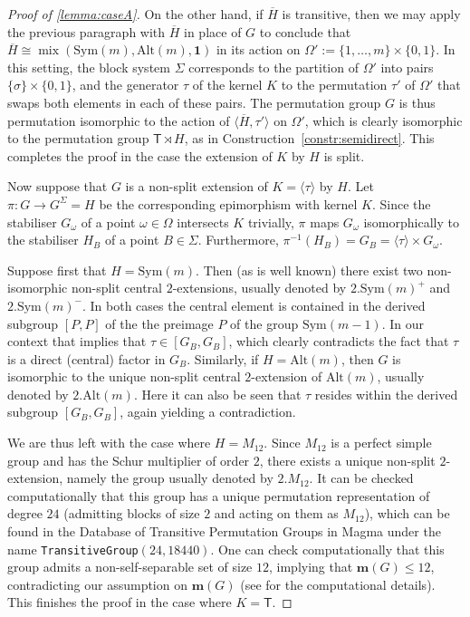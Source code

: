 \documentclass[a4paper]{amsart}
\newcommand{\primozcomment}[1]{\textcolor{magenta}{{\textbf{Primoz:} #1}}}
\newcommand{\Sym}{\mathrm{Sym}}
\newcommand{\Alt}{\mathrm{Alt}}
\newcommand{\m}{\mathbf{m}}
\newcommand{\mix}{\mathop{\mathrm{mix}}}
\newcommand{\one}{\mathbf{1}}
\theoremstyle{definition}
\begin{document}
\begin{proof}[Proof of \cref{lemma:caseA}]
On the other hand, if $\overline{H}$ is transitive, then we may apply the previous paragraph with 
$\overline{H}$ in place of
$G$ to conclude that $\overline{H} \cong \mix(\Sym(m),\Alt(m),\one)$ in its action on $\Omega':=\{1,\ldots,m\} \times \{0,1\}$. In this setting, the block system $\Sigma$ corresponds to the partition of $\Omega'$ into pairs $\{\sigma\} \times \{0,1\}$, and the generator $\tau$ of the kernel $K$ to the permutation
$\tau'$ of $\Omega'$ that swaps both elements in each of these pairs. The permutation group $G$ is thus permutation
isomorphic to the action of $\langle \overline{H},\tau'\rangle$ on $\Omega'$, which is clearly isomorphic to the
permutation group $\mathsf{T} \rtimes H$, as in Construction~\ref{constr:semidirect}. This completes the proof
in the case the extension of $K$ by $H$ is split.

Now suppose that $G$ is a non-split extension of $K=\langle \tau \rangle$ by $H$.
Let $\pi \colon G \to G^\Sigma = H$ be the corresponding epimorphism with kernel $K$.
Since the stabiliser $G_\omega$ of a point $\omega \in \Omega$ intersects $K$ trivially,
$\pi$ maps $G_\omega$ isomorphically to the stabiliser
$H_B$ of a point $B\in \Sigma$. Furthermore,
$\pi^{-1}(H_B) = G_B=\langle \tau \rangle \times G_\omega$.

Suppose first that $H=\Sym(m)$. Then (as is well known) there exist
two non-isomorphic non-split central  $2$-extensions, usually denoted by $2.\Sym(m)^+$ and $2.\Sym(m)^-$.
In both cases the central element is contained in the derived subgroup $[P,P]$ of the
the preimage $P$ of the group $\Sym(m-1)$. In our context that implies that $\tau \in [G_B,G_B]$,
which clearly contradicts the fact that $\tau$ is a direct (central) factor in $G_B$.
Similarly, if $H=\Alt(m)$, then $G$ is isomorphic to the unique non-split central  $2$-extension
of $\Alt(m)$, usually denoted by $2.\Alt(m)$. Here it can also be seen that $\tau$ resides within
the derived subgroup $[G_B,G_B]$, again yielding a contradiction.

We are thus left with the case where $H=M_{12}$. Since $M_{12}$ is a perfect simple group and has
the Schur multiplier of order $2$, there exists a unique non-split $2$-extension, namely the group
usually denoted by $2.M_{12}$. It can be checked computationally that this group has a unique
permutation representation of degree $24$ (admitting blocks of size $2$ and acting on them as $M_{12}$),
which can be found in the Database of Transitive Permutation Groups in {\sc Magma} \cite{magma} under the name
{\tt TransitiveGroup}$(24,18440)$. One can check computationally that this group admits a non-self-separable
set of size $12$, implying that $\m(G) \le 12$, contradicting our assumption on $\m(G)$ (see \cite{ourAlgorithm} for the computational details).
This finishes the proof in the case where $K=\mathsf{T}$.


\end{proof}
\end{document}
